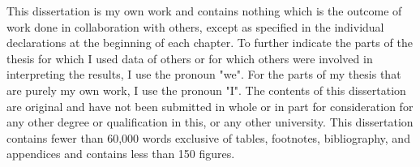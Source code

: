 
\begin{declaration}

This dissertation is my own work and contains nothing which is the outcome of work done in collaboration with others, except as specified in the individual declarations at the beginning of each chapter. To further indicate the parts of the thesis for which I used data of others or for which others were involved in interpreting the results, I use the pronoun "we". For the parts of my thesis that are purely my own work, I use the pronoun "I". The contents of this dissertation are original and have not been submitted in whole or in part for consideration for any other degree or qualification in this, or any other university. This dissertation contains fewer than 60,000 words exclusive of tables, footnotes, bibliography, and appendices and contains less than 150 figures.

\end{declaration}
